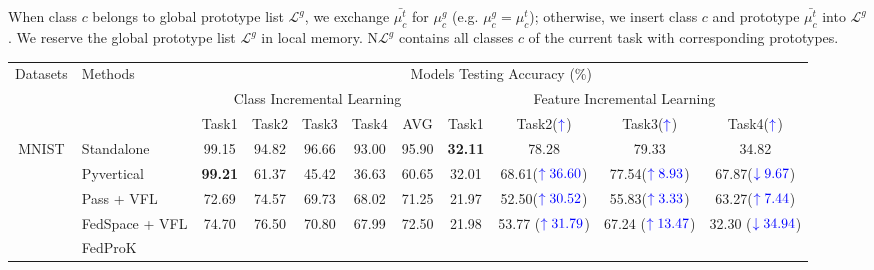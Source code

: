 When class $c$ belongs to global prototype list $\mathcal{L}^g$, we exchange $\bar{\mu_{c}^t}$ for $\mu_{c}^g$ (e.g. $\mu_{c}^{g} = \mu_{c}^t$); otherwise, we insert class $c$ and prototype $\bar{\mu_{c}^t}$ into $\mathcal{L}^g$.
We reserve the global prototype list $\mathcal{L}^g$ in local memory.
N$\mathcal{L}^g$ contains all classes $c$ of the current task with corresponding prototypes. 



\begin{table*}[!t]
\centering  
\setlength{\tabcolsep}{3.5pt}
\begin{tabular}{clccccc|cccc}
\toprule
\multirow{3}{*}{Datasets}                  & \multirow{3}{*}{Methods} & \multicolumn{9}{c}{Models Testing Accuracy (\%)}\\ 
\cmidrule{3-11}  
& &\multicolumn{5}{c|}{Class Incremental Learning}& \multicolumn{4}{c}{Feature Incremental Learning} \\ 
\cmidrule{3-11}
& & Task1 & Task2 & Task3 & Task4 & AVG & Task1 & Task2($\color{blue}{\uparrow}$) & Task3(${\color{blue}\uparrow}$) & Task4(${\color{blue}\uparrow}$) \\ \midrule
\multirow{6}{*}{MNIST}
& Standalone                  &  99.15    &  94.82   & 96.66 & 93.00  & 95.90& \textbf{32.11}    & 78.28   & 79.33 &  34.82 \\
& Pyvertical
& \textbf{99.21} &  61.37   &  45.42 & 36.63 &  60.65&  32.01  & 68.61(${\color{blue}\uparrow 36.60}$)  & 77.54(${\color{blue}\uparrow 8.93}$) &  67.87(${\color{blue}\downarrow 9.67}$)\\
&Pass
+ VFL             & 72.69     & 74.57   & 69.73 & 68.02 & 71.25 & 21.97   &52.50(${\color{blue}\uparrow30.52}$)  &55.83(${\color{blue}\uparrow3.33}$)  &63.27(${\color{blue}\uparrow7.44}$) \\
& FedSpace + VFL            & 74.70    & 76.50   & 70.80 & 67.99 & 72.50 & 21.98    & 53.77 (${\color{blue}\uparrow31.79}$)   & 67.24 (${\color{blue}\uparrow13.47}$) &  32.30 (${\color{blue}\downarrow34.94}$)\\
&FedProK

\end{tabular}
\end{table*}
